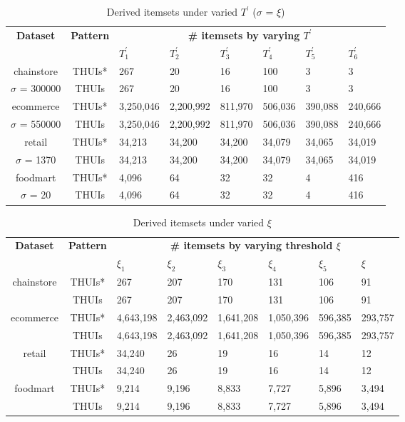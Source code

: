 \documentclass[journal]{IEEEtran}
\begin{document}
\begin{table}[htb]
	\fontsize{5pt}{9pt}\selectfont
	\centering
	\caption{Derived itemsets under varied $T^\prime$ ($\sigma$ = $\xi$)}
	\label{table:thresholdT}
	\begin{tabular}{c|c|llllll}
		\hline \hline
		\multirow{2}{*}{\textbf{Dataset}} & \multirow{2}{*}{\textbf{Pattern}} & \multicolumn{6}{c}{\textbf{\# itemsets by varying $T^\prime$}} \\ \cline{3-8}
		& &$T^\prime_1$ & $T^\prime_2$ & $T^\prime_3$ & $T^\prime_4$ & $T^\prime_5$ & $T^\prime_6$ \\ \hline
		chainstore & THUIs* & 267 & 20 & 16 & 100 & 3 & 3 \\
		$\sigma$ = 300000 & THUIs & 267 & 20 & 16 & 100 & 3 & 3 \\ \hline
		ecommerce & THUIs* & 3,250,046 & 2,200,992 & 811,970 & 506,036 & 390,088 & 240,666 \\
		$\sigma$ = 550000 & THUIs & 3,250,046 & 2,200,992 & 811,970 & 506,036 & 390,088 & 240,666 \\ \hline
		retail & THUIs* & 34,213 & 34,200 & 34,200 & 34,079 & 34,065 & 34,019 \\
		$\sigma$ = 1370 &THUIs & 34,213 & 34,200 & 34,200 & 34,079 & 34,065 & 34,019 \\ \hline
		foodmart & THUIs* & 4,096 & 64 & 32 & 32 & 4 & 416 \\
		$\sigma$ = 20 & THUIs & 4,096 & 64 & 32 & 32 & 4 & 416 \\ \hline 
		\hline
		
	\end{tabular}
\end{table}

\begin{table}[htb]
	\fontsize{5pt}{9pt}\selectfont
	\centering
	\caption{Derived itemsets under varied $\xi$}
	\label{table:thresholdxi}
	\begin{tabular}{c|c|llllll}
		\hline \hline
		\multirow{2}{*}{\textbf{Dataset}} & \multirow{2}{*}{\textbf{Pattern}} & \multicolumn{6}{c}{\textbf{\# itemsets by varying threshold $\xi$}} \\ \cline{3-8}
		& &$\xi_1$ & $\xi_2$ & $\xi_3$ & $\xi_4$ & $\xi_5$ & $\xi$ \\ \hline
		\multirow{2}{*}{chainstore} & THUIs* & 267 & 207 & 170 & 131 & 106 & 91 \\
		& THUIs & 267 & 207 & 170 & 131 & 106 & 91 \\ \hline
		\multirow{2}{*}{ecommerce} & THUIs* & 4,643,198 & 2,463,092 & 1,641,208 & 1,050,396 & 596,385 & 293,757 \\
		& THUIs & 4,643,198 & 2,463,092 & 1,641,208 & 1,050,396 & 596,385 & 293,757 \\ \hline
		\multirow{2}{*}{retail} & THUIs* &34,240  & 26 & 19 & 16 & 14 & 12 \\
		& THUIs & 34,240 & 26 & 19 & 16 & 14 & 12 \\ \hline
		\multirow{2}{*}{foodmart} & THUIs* & 9,214 & 9,196 & 8,833 & 7,727 & 5,896 & 3,494 \\
		& THUIs & 9,214 & 9,196 & 8,833 & 7,727 & 5,896 & 3,494 \\ \hline 
		\hline
	\end{tabular}
\end{table}
\end{document}
